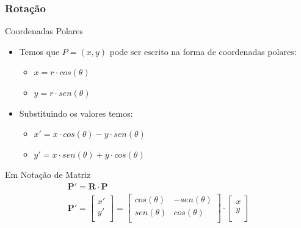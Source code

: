 \documentclass[fleqn]{beamer}
\begin{document}
\begin{frame}
\frametitle{Rotação}

	\begin{block}{Coordenadas Polares}
		\begin{itemize}
			\item<1-> Temos que $P = (x,y)$ pode ser escrito na forma de coordenadas polares:
				\begin{itemize}
					\item $x = r \cdot cos(\theta)$
					\item $y = r \cdot sen(\theta)$ 
				\end{itemize}
			\item<2-> Substituindo os valores temos:
				\begin{itemize}
					\item $x' = x \cdot cos(\theta) - y \cdot sen(\theta)$
					\item $y' = x \cdot sen(\theta) + y \cdot cos(\theta)$
				\end{itemize}
		\end{itemize}
	\end{block}
	
	\begin{block}{Em Notação de Matriz}
		\begin{eqnarray*}
			\textbf{P}' = \textbf{R} \cdot \textbf{P} \\
			\textbf{P}' = 	\begin{bmatrix} 
								x' \\
								y' \\
							\end{bmatrix}
			=
			 \begin{bmatrix}
								cos(\theta) & -sen(\theta) \\
								sen(\theta) & cos(\theta)\\
							\end{bmatrix}
			\cdot \begin{bmatrix}
								x \\
								y \\
							\end{bmatrix}
		\end{eqnarray*}
	\end{block}

	
\end{frame}


\end{document}
